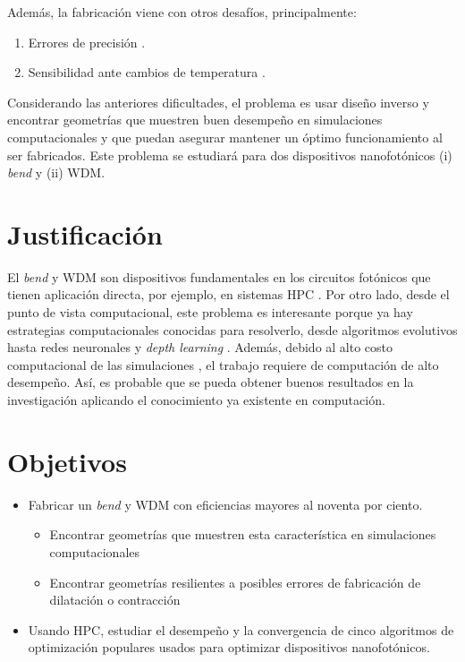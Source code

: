Además, la fabricación viene con otros desafíos, principalmente:

\begin{enumerate}
  \item Errores de precisión \citep{Piggott2017}.
  \item Sensibilidad ante cambios de temperatura \citep{Vuckovic2019}.
\end{enumerate}

Considerando las anteriores dificultades, el problema es usar diseño inverso y encontrar geometrías que muestren buen desempeño en simulaciones computacionales y que puedan asegurar mantener un óptimo funcionamiento al ser fabricados. 
Este problema se estudiará para dos dispositivos nanofotónicos (i) \emph{bend} y (ii) WDM.

\section{Justificación}

El \emph{bend} y WDM son dispositivos fundamentales en los circuitos fotónicos que tienen aplicación directa, por ejemplo, en sistemas HPC \citep{Shen2017}. 
Por otro lado, desde el punto de vista computacional, este problema es interesante porque ya hay estrategias computacionales conocidas para resolverlo, desde algoritmos evolutivos \citep{Hansen2016} hasta redes neuronales \citep{Goodfellow2015} y \emph{depth learning} \citep{Malkiel2018}. 
Además, debido al alto costo computacional de las simulaciones \citep{Schneider2019}, el trabajo requiere de computación de alto desempeño.
Así, es probable que se pueda obtener buenos resultados en la investigación aplicando el conocimiento ya existente en computación. 

\section{Objetivos}

\begin{itemize}

  \item Fabricar un \emph{bend} y WDM con eficiencias mayores al noventa por ciento.

  \begin{itemize}

    \item Encontrar geometrías que muestren esta característica en simulaciones computacionales

    \item Encontrar geometrías resilientes a posibles errores de fabricación de dilatación o contracción

  \end{itemize}

  \item Usando HPC, estudiar el desempeño y la convergencia de cinco algoritmos de optimización populares usados para optimizar dispositivos nanofotónicos.

\end{itemize}



